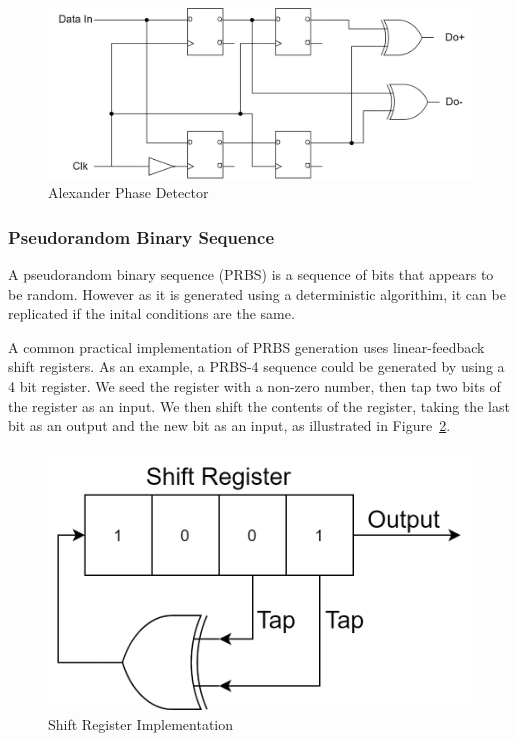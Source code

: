 \begin{figure}[ht]
    \centering
    \includegraphics[width=0.8\linewidth]{img/bang_bang.png}
    \caption{Alexander Phase Detector}%
    \label{fig:bang_bang}
\end{figure}

\subsubsection{Pseudorandom Binary Sequence}%
\label{ssub:prbs_generation}
A pseudorandom binary sequence (PRBS) is a sequence of bits that appears to be
random. However as it is generated using a deterministic algorithim, it can be
replicated if the inital conditions are the same.

A common practical implementation of PRBS generation uses linear-feedback shift registers.  As an
example, a PRBS-4 sequence could be generated by using a 4 bit register. We
seed the register with a non-zero number, then tap two bits of the register as
an input. We then shift the contents of the register, taking the last bit as an
output and the new bit as an input, as illustrated in
Figure~\ref{fig:img/shift_reg}.

\begin{figure}[ht]
    \centering
    \includegraphics[width=0.4\linewidth]{img/shift_reg.png}
    \caption{Shift Register Implementation}%
    \label{fig:img/shift_reg}
\end{figure}


